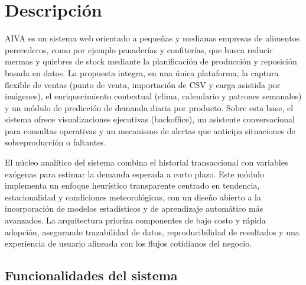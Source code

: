 \chapter{Descripción}\label{chapter03}

AIVA es un sistema web orientado a pequeñas y medianas empresas de alimentos perecederos, como por ejemplo panaderías y confiterías, que busca reducir mermas y quiebres de stock mediante la planificación de producción y reposición basada en datos. La propuesta integra, en una única plataforma, la captura flexible de ventas (punto de venta, importación de CSV y carga asistida por imágenes), el enriquecimiento contextual (clima, calendario y patrones semanales) y un módulo de predicción de demanda diaria por producto. Sobre esta base, el sistema ofrece visualizaciones ejecutivas (backoffice), un asistente conversacional para consultas operativas y un mecanismo de alertas que anticipa situaciones de sobreproducción o faltantes. 

El núcleo analítico del sistema combina el historial transaccional con variables exógenas para estimar la demanda esperada a corto plazo. Este módulo implementa un enfoque heurístico transparente centrado en tendencia, estacionalidad y condiciones meteorológicas, con un diseño abierto a la incorporación de modelos estadísticos y de aprendizaje automático más avanzados. La arquitectura prioriza componentes de bajo costo y rápida adopción, asegurando trazabilidad de datos, reproducibilidad de resultados y una experiencia de usuario alineada con los flujos cotidianos del negocio.

\vspace{1cm}

\section{Funcionalidades del sistema}

